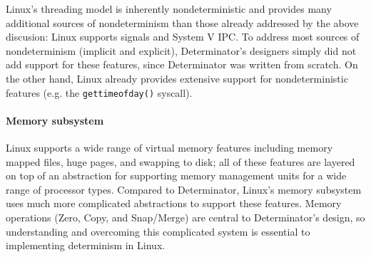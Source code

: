 \begin{itemize}
Linux's threading model is inherently nondeterministic and provides many
additional sources of nondeterminism than those already addressed by the above
discusion: Linux supports signals and System V IPC. To address most sources of
nondeterminism (implicit and explicit), Determinator's designers simply did not
add support for these features, since Determinator was written from scratch. On
the other hand, Linux already provides extensive support for nondeterministic
features (e.g. the {\tt gettimeofday()} syscall).

\paragraph{Memory subsystem} Linux supports a wide range of virtual memory
features including memory mapped files, huge pages, and swapping to disk; all
of these features are layered on top of an abstraction for supporting memory
management units for a wide range of processor types. Compared to Determinator,
Linux's memory subsystem uses much more complicated abstractions to support
these features. Memory operations (Zero, Copy, and Snap/Merge) are central to
Determinator's design, so understanding and overcoming this complicated system
is essential to implementing determinism in Linux.


\end{itemize}
